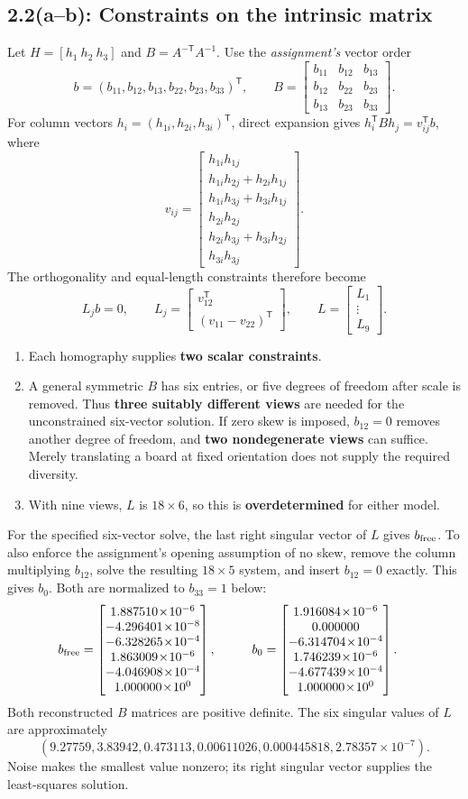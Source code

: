 \documentclass[10pt,letterpaper]{article}
\newcommand{\T}{^{\mathsf T}}
\begin{document}
\subsection*{2.2(a--b): Constraints on the intrinsic matrix}
Let $H=[h_1\ h_2\ h_3]$ and $B=A^{-\mathsf T}A^{-1}$. Use the
\emph{assignment's} vector order
\[
b=(b_{11},b_{12},b_{13},b_{22},b_{23},b_{33})\T,\qquad
B=\begin{bmatrix}b_{11}&b_{12}&b_{13}\\b_{12}&b_{22}&b_{23}\\
b_{13}&b_{23}&b_{33}\end{bmatrix}.
\]
For column vectors $h_i=(h_{1i},h_{2i},h_{3i})\T$, direct expansion gives
$h_i\T B h_j=v_{ij}\T b$, where
\[
v_{ij}=\begin{bmatrix}
h_{1i}h_{1j}\\h_{1i}h_{2j}+h_{2i}h_{1j}\\
h_{1i}h_{3j}+h_{3i}h_{1j}\\h_{2i}h_{2j}\\
h_{2i}h_{3j}+h_{3i}h_{2j}\\h_{3i}h_{3j}
\end{bmatrix}.
\]
The orthogonality and equal-length constraints therefore become
\begin{equation}
\boxed{L_jb=0,\qquad L_j=\begin{bmatrix}
v_{12}\T\\(v_{11}-v_{22})\T
\end{bmatrix},\qquad L=\begin{bmatrix}L_1\\\vdots\\L_9\end{bmatrix}.}
\end{equation}
\begin{enumerate}
\item Each homography supplies \textbf{two scalar constraints}.
\item A general symmetric $B$ has six entries, or five degrees of freedom
after scale is removed. Thus \textbf{three suitably different views} are
needed for the unconstrained six-vector solution. If zero skew is imposed,
$b_{12}=0$ removes another degree of freedom, and \textbf{two nondegenerate
views} can suffice. Merely translating a board at fixed orientation does
not supply the required diversity.
\item With nine views, $L$ is $18\times6$, so this is \textbf{overdetermined}
for either model.
\end{enumerate}
For the specified six-vector solve, the last right singular vector of $L$
gives $b_{\rm free}$. To also enforce the assignment's opening assumption of
no skew, remove the column multiplying $b_{12}$, solve the resulting
$18\times5$ system, and insert $b_{12}=0$ exactly. This gives $b_0$.
Both are normalized to $b_{33}=1$ below:
\[
\begin{aligned}
b_{\rm free}&=\bfree,&\qquad b_0&=\bfinal.
\end{aligned}
\]
Both reconstructed $B$ matrices are positive definite. The six singular
values of $L$ are approximately
\[
(9.27759,3.83942,0.473113,0.00611026,0.000445818,2.78357\times10^{-7}).
\]
Noise makes the smallest value nonzero; its right singular vector supplies
the least-squares solution.
\end{document}
